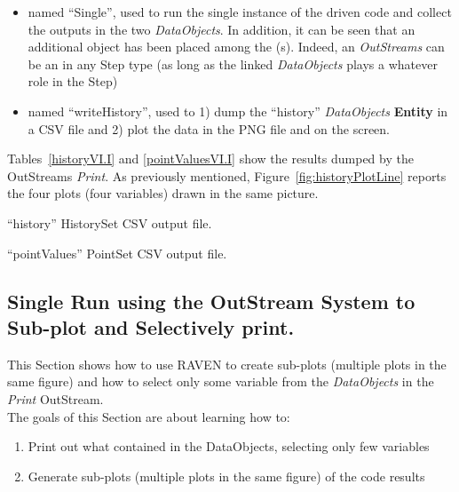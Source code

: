 \begin{enumerate}
   \begin{itemize}
     \item {} named ``Single'', used to run the single instance of the driven code and collect
     the outputs in the two \textit{DataObjects}. In addition, it can be seen that an additional object has been
     placed among the (s). Indeed, an  \textit{OutStreams} can be an  in
     any Step type (as long as the linked \textit{DataObjects} plays a whatever role in the Step)
     \item  {} named ``writeHistory'', used to 1) dump the ``history'' \textit{DataObjects}
     \textbf{Entity} in a CSV file and 2) plot the data in the PNG file and on the screen.
   \end{itemize}
\end{enumerate}
 Tables~\ref{historyVI.I} and \ref{pointValuesVI.I} show the results dumped by the OutStreams \textit{Print}.
 As previously mentioned, Figure~\ref{fig:historyPlotLine} reports the four plots (four variables) drawn in the same picture.
 \begin{table}[h!]
   \centering
   \caption{``history'' HistorySet CSV output file.}
   \label{historyVI.I}
 \end{table}
 \begin{table}[h!]
   \centering
   \caption{``pointValues'' PointSet CSV output file.}
   \label{pointValuesVI.I}
 \end{table}

\subsection{Single Run using the OutStream System to Sub-plot and Selectively print.}
This Section shows how to use RAVEN to create sub-plots (multiple plots in the same figure) and
how to select only some variable from the \textit{DataObjects} in the \textit{Print} OutStream.
 \\ The goals of this Section are about learning how to:
 \begin{enumerate}
   \item Print out what contained in the DataObjects, selecting only few variables
   \item Generate sub-plots (multiple plots in the same figure) of the code results
\end{enumerate}

